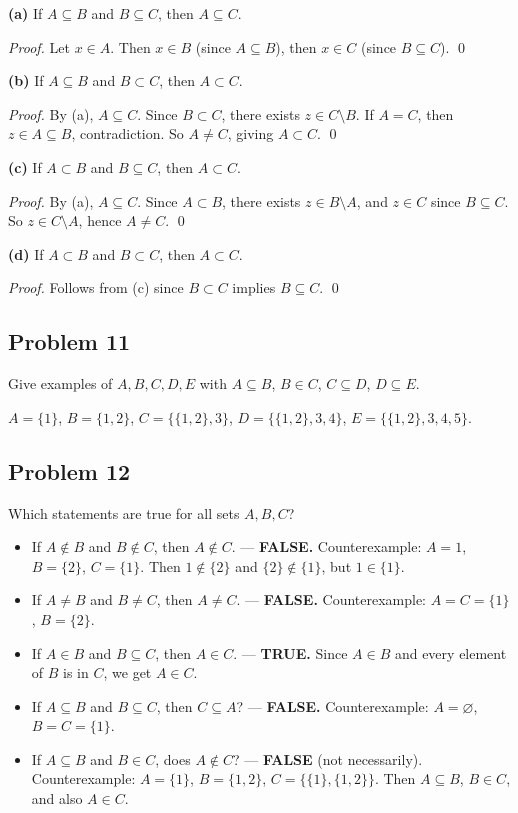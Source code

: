 \textbf{(a)} If $A \subseteq B$ and $B \subseteq C$, then $A \subseteq C$.

\textit{Proof.} Let $x \in A$. Then $x \in B$ (since $A \subseteq B$), then $x \in C$ (since $B \subseteq C$). \qed

\textbf{(b)} If $A \subseteq B$ and $B \subset C$, then $A \subset C$.

\textit{Proof.} By (a), $A \subseteq C$. Since $B \subset C$, there exists $z \in C \setminus B$. If $A = C$, then $z \in A \subseteq B$, contradiction. So $A \neq C$, giving $A \subset C$. \qed

\textbf{(c)} If $A \subset B$ and $B \subseteq C$, then $A \subset C$.

\textit{Proof.} By (a), $A \subseteq C$. Since $A \subset B$, there exists $z \in B \setminus A$, and $z \in C$ since $B \subseteq C$. So $z \in C \setminus A$, hence $A \neq C$. \qed

\textbf{(d)} If $A \subset B$ and $B \subset C$, then $A \subset C$.

\textit{Proof.} Follows from (c) since $B \subset C$ implies $B \subseteq C$. \qed

\subsection*{Problem 11}
Give examples of $A, B, C, D, E$ with $A \subseteq B$, $B \in C$, $C \subseteq D$, $D \subseteq E$.

$A = \{1\}$, $B = \{1,2\}$, $C = \{\{1,2\},3\}$, $D = \{\{1,2\},3,4\}$, $E = \{\{1,2\},3,4,5\}$.

\subsection*{Problem 12}
Which statements are true for all sets $A, B, C$?

\begin{itemize}
  \item[(a)] If $A \notin B$ and $B \notin C$, then $A \notin C$. --- \textbf{FALSE.}
    Counterexample: $A = 1$, $B = \{2\}$, $C = \{1\}$. Then $1 \notin \{2\}$ and $\{2\} \notin \{1\}$, but $1 \in \{1\}$.
  \item[(b)] If $A \neq B$ and $B \neq C$, then $A \neq C$. --- \textbf{FALSE.}
    Counterexample: $A = C = \{1\}$, $B = \{2\}$.
  \item[(c)] If $A \in B$ and $B \subseteq C$, then $A \in C$. --- \textbf{TRUE.}
    Since $A \in B$ and every element of $B$ is in $C$, we get $A \in C$.
  \item[(d)] If $A \subseteq B$ and $B \subseteq C$, then $C \subseteq A$? --- \textbf{FALSE.}
    Counterexample: $A = \varnothing$, $B = C = \{1\}$.
  \item[(e)] If $A \subseteq B$ and $B \in C$, does $A \notin C$? --- \textbf{FALSE} (not necessarily).
    Counterexample: $A = \{1\}$, $B = \{1,2\}$, $C = \{\{1\},\{1,2\}\}$. Then $A \subseteq B$, $B \in C$, and also $A \in C$.
\end{itemize}

